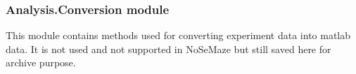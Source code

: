 \documentclass[letterpaper,10pt,english]{sphinxmanual}
\begin{document}
\begin{DUlineblock}{0em}
\item[] 
\end{DUlineblock}


\subsubsection{Analysis.Conversion module}
\label{\detokenize{NoSeMazeController/Analysis:module-Analysis.Conversion}}\label{\detokenize{NoSeMazeController/Analysis:analysis-conversion-module}}
\sphinxAtStartPar
This module contains methods used for converting experiment data into matlab
data. It is not used and not supported in NoSeMaze but still saved here for
archive purpose.
\end{document}
